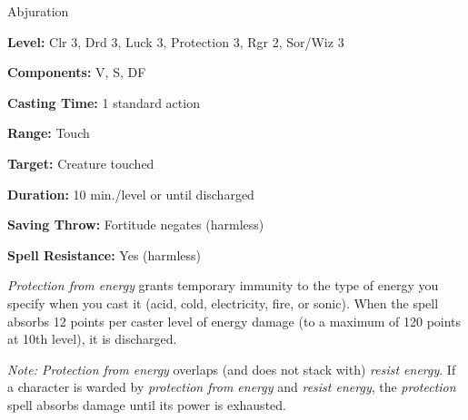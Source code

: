 
Abjuration

\textbf{Level:} Clr 3, Drd 3, Luck 3, Protection 3, Rgr 2, Sor/Wiz 3

\textbf{Components:} V, S, DF

\textbf{Casting Time:} 1 standard action

\textbf{Range:} Touch

\textbf{Target:} Creature touched

\textbf{Duration:} 10 min./level or until discharged

\textbf{Saving Throw:} Fortitude negates (harmless)

\textbf{Spell Resistance:} Yes (harmless)

\textit{Protection from energy} grants temporary immunity to the type of energy 
you specify when you cast it (acid, cold, electricity, fire, or sonic). When the 
spell absorbs 12 points per caster level of energy damage (to a maximum of 120 
points at 10th level), it is discharged.

\textit{Note: Protection from energy} overlaps (and does not stack with) \textit{resist 
energy}. If a character is warded by \textit{protection from energy} and \textit{resist 
energy}, the \textit{protection} spell absorbs damage until its power is exhausted.

